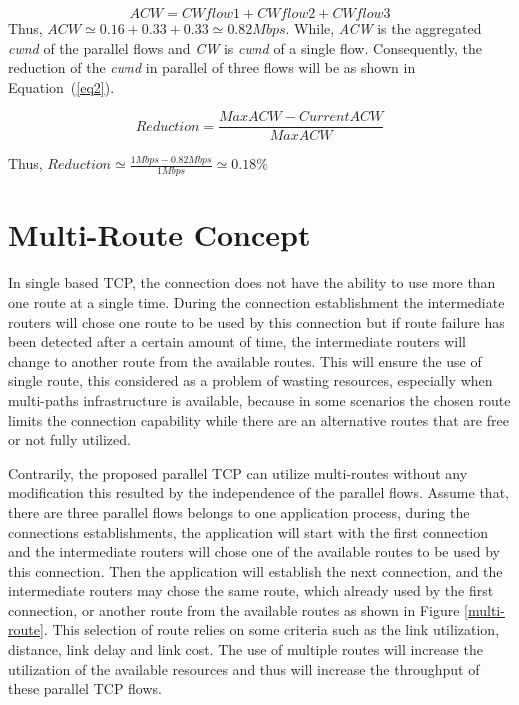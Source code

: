 \documentclass[a4paper, conference]{IEEEtran}
\begin{document}
\begin{equation}
\label{eq1}
ACW = CWflow1 + CWflow2 + CWflow3
\end{equation}
Thus, $ACW \simeq 0.16 + 0.33 + 0.33  \simeq 0.82 Mbps$.
\newline\newline
While, \emph{ACW} is the aggregated \textit{cwnd} of the parallel flows and \emph{CW} is \textit{cwnd} of a single flow. Consequently, the reduction of the \textit{cwnd} in parallel of three flows will be as shown in Equation~(\ref{eq2}).

\begin{equation}
\label{eq2}
Reduction = \frac{Max ACW - CurrentACW}{Max ACW}
\end{equation}

Thus, $Reduction \simeq \frac{1 Mbps - 0.82 Mbps}{1 Mbps} \simeq 0.18\%$
\vspace{0.5cm}

\section{Multi-Route Concept}

In single based TCP, the connection does not have the ability to use more than one route at a single time. During the connection establishment the intermediate routers will chose one route to be used by this connection but if route failure has been detected after a certain amount of time, the intermediate routers will change to another route from the available routes. This will ensure the use of single route, this considered as a problem of wasting resources, especially when multi-paths infrastructure is available, because in some scenarios the chosen route limits the connection capability while there are an alternative routes that are free or not fully utilized.

Contrarily, the proposed parallel TCP can utilize multi-routes without any modification this resulted by the independence of the parallel flows. Assume that, there are three parallel flows belongs to one application process, during the connections establishments, the application will start with the first connection and the intermediate routers will chose one of the available routes to be used by this connection. Then the application will establish the next connection, and the intermediate routers may chose the same route, which already used by the first connection, or another route from the available routes as shown in Figure \ref{multi-route}. This selection of route relies on some criteria such as the link utilization, distance, link delay and link cost. The use of multiple routes will increase the utilization of the available resources and thus will increase the throughput of these parallel TCP flows.
\end{document}
